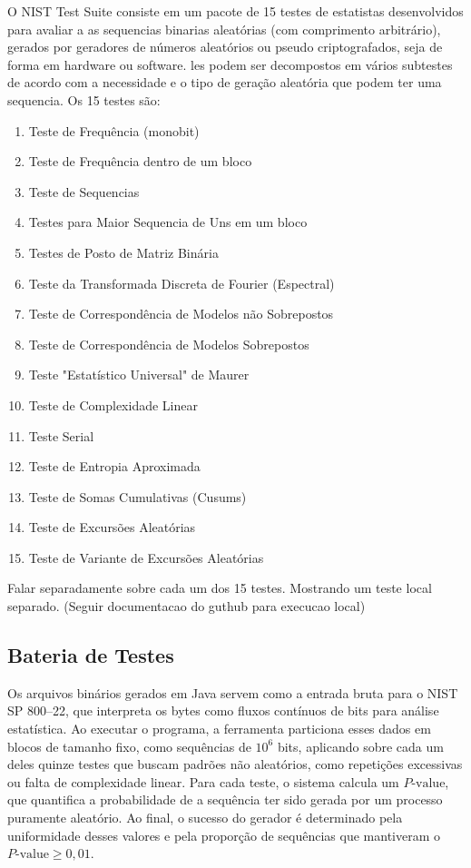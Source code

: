         O NIST Test Suite consiste em um pacote de 15 testes de estatistas desenvolvidos para avaliar a as sequencias binarias aleatórias (com comprimento arbitrário),
        gerados por geradores de números aleatórios ou pseudo criptografados, seja de forma em hardware ou software. 
        les podem ser decompostos em vários subtestes de acordo com a necessidade e o tipo de geração aleatória que podem ter uma sequencia. Os 15 testes são:
        \begin{enumerate}
          \item Teste de Frequência (monobit)
          \item Teste de Frequência dentro de um bloco
          \item Teste de Sequencias
          \item Testes para Maior Sequencia de Uns em um bloco
          \item Testes de Posto de Matriz Binária
          \item Teste da Transformada Discreta de Fourier (Espectral)
          \item Teste de Correspondência de Modelos não Sobrepostos
          \item Teste de Correspondência de Modelos Sobrepostos
          \item Teste "Estatístico Universal" de Maurer
          \item Teste de Complexidade Linear
          \item Teste Serial
          \item Teste de Entropia Aproximada
          \item Teste de Somas Cumulativas (Cusums)
          \item Teste de Excursões Aleatórias
          \item Teste de Variante de Excursões Aleatórias
        \end{enumerate}\nocite{6.4NistsTP}

        Falar separadamente sobre cada um dos 15 testes. Mostrando um teste local separado. (Seguir documentacao do guthub para execucao local)\cite{6.4NISTGit}
        
        \subsection{Bateria de Testes}%

            Os arquivos binários gerados em Java servem como a entrada bruta para o NIST SP 800--22, 
            que interpreta os bytes como fluxos contínuos de bits para análise estatística. Ao executar o programa, 
            a ferramenta particiona esses dados em blocos de tamanho fixo, como sequências de $10^{6}$ bits, 
            aplicando sobre cada um deles quinze testes que buscam padrões não aleatórios, como repetições excessivas ou falta de complexidade linear. 
            Para cada teste, o sistema calcula um $P\text{-value}$, que quantifica a probabilidade de a sequência ter sido gerada por um processo puramente aleatório. 
            Ao final, o sucesso do gerador é determinado pela uniformidade desses valores e pela proporção de sequências que mantiveram o $P\text{-value} \geq 0,01$.

